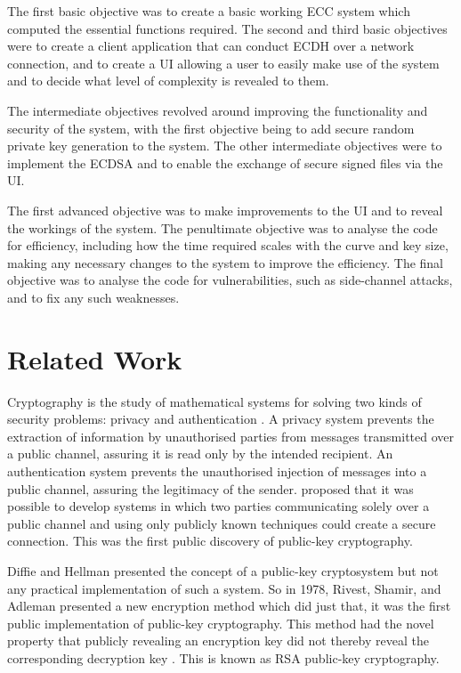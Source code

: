 \documentclass[12pt,a4paper]{article}
\begin{document}
The first basic objective was to create a basic working ECC system which computed the essential functions required. 
The second and third basic objectives were to create a client application that can conduct ECDH over a network connection, 
and to create a UI allowing a user to easily make use of the system and to decide what level of complexity is revealed to them. 

The intermediate objectives revolved around improving the functionality and security of the system, 
with the first objective being to add secure random private key generation to the system. 
The other intermediate objectives were to implement the ECDSA and to enable the exchange of secure signed files via the UI. 

The first advanced objective was to make improvements to the UI and to reveal the workings of the system. 
The penultimate objective was to analyse the code for efficiency, including how the time required scales with the curve and key size, 
making any necessary changes to the system to improve the efficiency. 
The final objective was to analyse the code for vulnerabilities, such as side-channel attacks, and to fix any such weaknesses. 


\section{Related Work}
Cryptography is the study of mathematical systems for solving two kinds of security problems: privacy and authentication \cite{1055638}. 
A privacy system prevents the extraction of information by unauthorised parties from messages transmitted over a public channel, assuring it is read only by the intended recipient. 
An authentication system prevents the unauthorised injection of messages into a public channel, assuring the legitimacy of the sender. 
\cite{1055638} proposed that it was possible to develop systems in which two parties communicating solely over a public channel and using only publicly known techniques could create a secure connection. 
This was the first public discovery of public-key cryptography.

Diffie and Hellman presented the concept of a public-key cryptosystem but not any practical implementation of such a system. 
So in 1978, Rivest, Shamir, and Adleman presented a new encryption method which did just that, it was the first public implementation of public-key cryptography. 
This method had the novel property that publicly revealing an encryption key did not thereby reveal the corresponding decryption key \cite{10.1145/359340.359342}. 
This is known as RSA public-key cryptography. 
\end{document}
